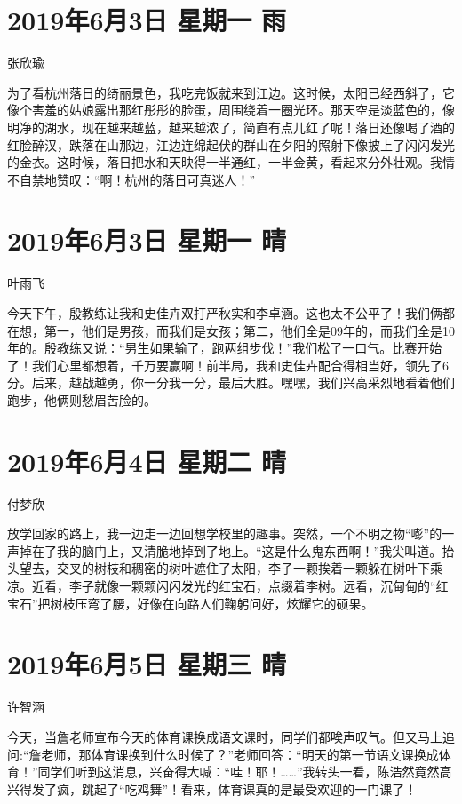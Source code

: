 \section{2019年6月3日 星期一 雨}

张欣瑜

为了看杭州落日的绮丽景色，我吃完饭就来到江边。这时候，太阳已经西斜了，它像个害羞的姑娘露出那红彤彤的脸蛋，周围绕着一圈光环。那天空是淡蓝色的，像明净的湖水，现在越来越蓝，越来越浓了，简直有点儿红了呢！落日还像喝了酒的红脸醉汉，跌落在山那边，江边连绵起伏的群山在夕阳的照射下像披上了闪闪发光的金衣。这时候，落日把水和天映得一半通红，一半金黄，看起来分外壮观。我情不自禁地赞叹：“啊！杭州的落日可真迷人！”

\section{2019年6月3日 星期一 晴}

叶雨飞

今天下午，殷教练让我和史佳卉双打严秋实和李卓涵。这也太不公平了！我们俩都在想，第一，他们是男孩，而我们是女孩；第二，他们全是09年的，而我们全是10年的。殷教练又说：“男生如果输了，跑两组步伐！”我们松了一口气。比赛开始了！我们心里都想着，千万要赢啊！前半局，我和史佳卉配合得相当好，领先了6分。后来，越战越勇，你一分我一分，最后大胜。嘿嘿，我们兴高采烈地看着他们跑步，他俩则愁眉苦脸的。

\section{2019年6月4日 星期二 晴}

付梦欣

放学回家的路上，我一边走一边回想学校里的趣事。突然，一个不明之物“嘭”的一声掉在了我的脑门上，又清脆地掉到了地上。“这是什么鬼东西啊！”我尖叫道。抬头望去，交叉的树枝和稠密的树叶遮住了太阳，李子一颗挨着一颗躲在树叶下乘凉。近看，李子就像一颗颗闪闪发光的红宝石，点缀着李树。远看，沉甸甸的“红宝石”把树枝压弯了腰，好像在向路人们鞠躬问好，炫耀它的硕果。

\section{2019年6月5日 星期三 晴}

许智涵

今天，当詹老师宣布今天的体育课换成语文课时，同学们都唉声叹气。但又马上追问:“詹老师，那体育课换到什么时候了？”老师回答：“明天的第一节语文课换成体育！”同学们听到这消息，兴奋得大喊：“哇！耶！……”我转头一看，陈浩然竟然高兴得发了疯，跳起了“吃鸡舞”！看来，体育课真的是最受欢迎的一门课了！

